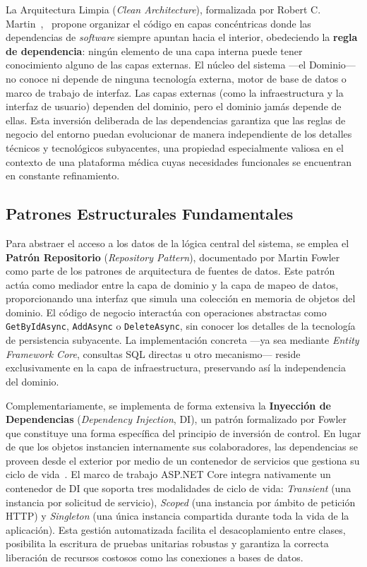 La Arquitectura Limpia (\textit{Clean Architecture}), formalizada por Robert C. Martin~\cite{martin_clean_architecture}, \
propone organizar el código en capas concéntricas donde las dependencias de \textit{software} siempre 
apuntan hacia el interior, obedeciendo la \textbf{regla de dependencia}: ningún elemento de una capa 
interna puede tener conocimiento alguno de las capas externas. El núcleo del sistema ---el Dominio--- no 
conoce ni depende de ninguna tecnología externa, motor de base de datos o marco de trabajo de interfaz. 
Las capas externas (como la infraestructura y la interfaz de usuario) dependen del dominio, pero el 
dominio jamás depende de ellas. Esta inversión deliberada de las dependencias garantiza que las reglas 
de negocio del entorno puedan evolucionar de manera independiente de los detalles técnicos y 
tecnológicos subyacentes, una propiedad especialmente valiosa en el contexto de una plataforma médica 
cuyas necesidades funcionales se encuentran en constante refinamiento.

\subsection{Patrones Estructurales Fundamentales}
Para abstraer el acceso a los datos de la lógica central del sistema, se emplea 
el \textbf{Patrón Repositorio} (\textit{Repository Pattern}), documentado por Martin Fowler~\cite{fowler_peaa} 
como parte de los patrones de arquitectura de fuentes de datos. Este patrón actúa como mediador entre la 
capa de dominio y la capa de mapeo de datos, proporcionando una interfaz que simula una colección en 
memoria de objetos del dominio. El código de negocio interactúa con operaciones abstractas 
como \texttt{GetByIdAsync}, \texttt{AddAsync} o \texttt{DeleteAsync}, sin conocer los detalles de la 
tecnología de persistencia subyacente. La implementación concreta ---ya sea 
mediante \textit{Entity Framework Core}, consultas SQL directas u otro mecanismo--- reside exclusivamente 
en la capa de infraestructura, preservando así la independencia del dominio.

Complementariamente, se implementa de forma extensiva la \textbf{Inyección de Dependencias} 
(\textit{Dependency Injection}, DI), un patrón formalizado por Fowler~\cite{fowler_di} que constituye 
una forma específica del principio de inversión de control. En lugar de que los objetos instancien 
internamente sus colaboradores, las dependencias se proveen desde el exterior por medio de un contenedor 
de servicios que gestiona su ciclo de vida~\cite{dotnet_di_docs}. El marco de trabajo ASP.NET Core integra 
nativamente un contenedor de DI que soporta tres modalidades de ciclo de vida: \textit{Transient} 
(una instancia por solicitud de servicio), \textit{Scoped} (una instancia por ámbito de petición HTTP) y 
\textit{Singleton} (una única instancia compartida durante toda la vida de la aplicación). Esta gestión 
automatizada facilita el desacoplamiento entre clases, posibilita la escritura de pruebas unitarias 
robustas y garantiza la correcta liberación de recursos costosos como las conexiones a bases de datos.

